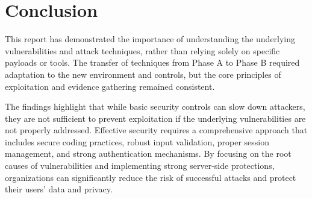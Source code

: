 \documentclass[11pt,a4paper]{report}
\begin{document}
    \chapter{Conclusion}
        
        This report has demonstrated the importance of understanding the underlying vulnerabilities and attack techniques, rather than relying solely on specific payloads or tools. The transfer of techniques from Phase A to Phase B required adaptation to the new environment and controls, but the core principles of exploitation and evidence gathering remained consistent.

        The findings highlight that while basic security controls can slow down attackers, they are not sufficient to prevent exploitation if the underlying vulnerabilities are not properly addressed. Effective security requires a comprehensive approach that includes secure coding practices, robust input validation, proper session management, and strong authentication mechanisms. By focusing on the root causes of vulnerabilities and implementing strong server-side protections, organizations can significantly reduce the risk of successful attacks and protect their users' data and privacy.
\end{document}
